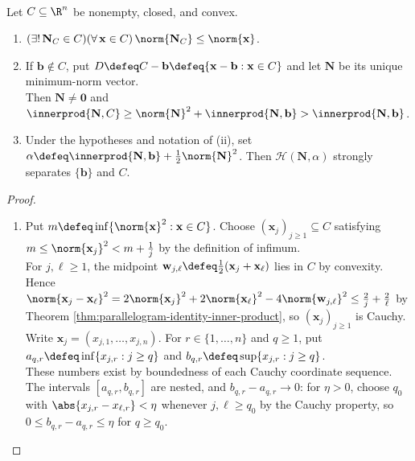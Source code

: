 \begin{theorem} \label{thm:nearest-point-and-point-separation-convex-set} \\
Let $C\subseteq\R^n$ be nonempty, closed, and convex.
\begin{enumerate}[label=(\roman*)]
\setlength{\itemsep}{0pt}
\item $(\exists!\,\mathbf{N}_C\in C)(\forall\,\mathbf{x}\in C)\,\norm{\mathbf{N}_C}\leq\norm{\mathbf{x}}$.
\item If $\mathbf{b}\notin C$, put $D\defeq C-\mathbf{b}\defeq\{\mathbf{x}-\mathbf{b}:\mathbf{x}\in C\}$ and let $\mathbf{N}$ be its unique minimum-norm vector.\\
Then $\mathbf{N}\neq\mathbf{0}$ and $\innerprod{\mathbf{N},C}\geq\norm{\mathbf{N}}^2+\innerprod{\mathbf{N},\mathbf{b}}>\innerprod{\mathbf{N},\mathbf{b}}$.
\item Under the hypotheses and notation of (ii), set $\alpha\defeq\innerprod{\mathbf{N},\mathbf{b}}+\frac{1}{2}\norm{\mathbf{N}}^2$. Then $\mathcal{H}(\mathbf{N},\alpha)$ strongly separates $\{\mathbf{b}\}$ and $C$.
\end{enumerate}
\begin{proof}
\begin{enumerate}[label=(\roman*)]
\setlength{\itemsep}{0pt}
\item Put $m\defeq\inf\{\norm{\mathbf{x}}^2:\mathbf{x}\in C\}$. Choose $(\mathbf{x}_j)_{j\geq1}\subseteq C$ satisfying $m\leq\norm{\mathbf{x}_j}^2<m+\frac{1}{j}$ by the definition of infimum.\\
For $j,\ell\geq1$, the midpoint $\mathbf{w}_{j,\ell}\defeq\frac{1}{2}(\mathbf{x}_j+\mathbf{x}_\ell)$ lies in $C$ by convexity.\\
Hence $\norm{\mathbf{x}_j-\mathbf{x}_\ell}^2=2\norm{\mathbf{x}_j}^2+2\norm{\mathbf{x}_\ell}^2-4\norm{\mathbf{w}_{j,\ell}}^2\leq\frac{2}{j}+\frac{2}{\ell}$ by Theorem \ref{thm:parallelogram-identity-inner-product}, so $(\mathbf{x}_j)_{j\geq1}$ is Cauchy.\\
Write $\mathbf{x}_j=(x_{j,1},\ldots,x_{j,n})$. For $r\in\{1,\ldots,n\}$ and $q\geq1$, put $a_{q,r}\defeq\inf\{x_{j,r}:j\geq q\}$ and $b_{q,r}\defeq\sup\{x_{j,r}:j\geq q\}$.\\
These numbers exist by boundedness of each Cauchy coordinate sequence. The intervals $[a_{q,r},b_{q,r}]$ are nested, and $b_{q,r}-a_{q,r}\to0$: for $\eta>0$, choose $q_0$ with $\abs{x_{j,r}-x_{\ell,r}}<\eta$ whenever $j,\ell\geq q_0$ by the Cauchy property, so $0\leq b_{q,r}-a_{q,r}\leq\eta$ for $q\geq q_0$.\\

\end{enumerate}
\end{proof}
\end{theorem}
